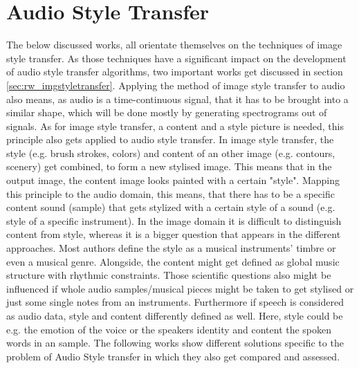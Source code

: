 \section{Audio Style Transfer}
\label{sec:rw_audio_style_transfer}
The below discussed works, all orientate themselves on the techniques of image style transfer. As those techniques have a significant impact on the development of audio style transfer algorithms, two important works get discussed in section \ref{sec:rw_imgstyletransfer}. Applying the method of image style transfer to audio also means, as audio is a time-continuous signal, that it has to be brought into a similar shape, which will be done mostly by generating spectrograms out of signals. As for image style transfer, a content and a style picture is needed, this principle also gets applied to audio style transfer. In image style transfer, the style (e.g. brush strokes, colors) and content of an other image (e.g. contours, scenery) get combined, to form a new stylised image. \cite{Gatys2016} This means that in the output image, the content image looks painted with a certain "style". Mapping this principle to the audio domain, this means, that there has to be a specific content sound (sample) that gets stylized with a certain style of a sound (e.g. style of a specific instrument). In the image domain it is difficult to distinguish content from style, whereas it is a bigger question that appears in the different approaches. Most authors define the style as a musical instruments' timbre or even a musical genre. Alongside, the content might get defined as global music structure with rhythmic constraints. \cite{Grinstein2018} Those scientific questions also might be influenced if whole audio samples/musical pieces might be taken to get stylised or just some single notes from an instruments. Furthermore if speech is considered as audio data, style and content differently defined as well. Here, style could be e.g. the emotion of the voice or the speakers identity and content the spoken words in an sample. The following works show different solutions specific to the problem of Audio Style transfer in which they also get compared and assessed. \\

